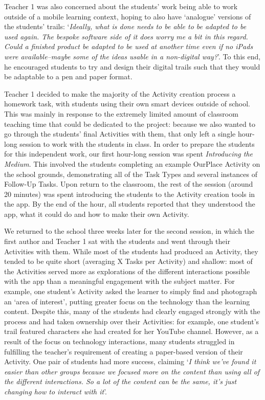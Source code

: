 \documentclass[,hyphens]{sigchi}
\begin{document}
Teacher 1 was also concerned about the students' work being able to work outside of a mobile learning context, hoping to also have `analogue' versions of the students' trails: `\textit{Ideally, what is done needs to be able to be adapted to be used again. The bespoke software side of it does worry me a bit in this regard. Could a finished product be adapted to be used at another time even if no iPads were available--maybe some of the ideas usable in a non-digital way?}'. To this end, he encouraged students to try and design their digital trails such that they would be adaptable to a pen and paper format.

Teacher 1 decided to make the majority of the Activity creation process a homework task, with students using their own smart devices outside of school. This was mainly in response to the extremely limited amount of classroom teaching time that could be dedicated to the project: because we also wanted to go through the students' final Activities with them, that only left a single hour-long session to work with the students in class. In order to prepare the students for this independent work, our first hour-long session was spent \textit{Introducing the Medium}. This involved the students completing an example OurPlace Activity on the school grounds, demonstrating all of the Task Types and several instances of Follow-Up Tasks. Upon return to the classroom, the rest of the session (around 20 minutes) was spent introducing the students to the Activity creation tools in the app. By the end of the hour, all students reported that they understood the app, what it could do and how to make their own Activity.

We returned to the school three weeks later for the second session, in which the first author and Teacher 1 sat with the students and went through their Activities with them. While most of the students had produced an Activity, they tended to be quite short (averaging X Tasks per Activity) and shallow: most of the Activities served more as explorations of the different interactions possible with the app than a meaningful engagement with the subject matter. For example, one student's Activity asked the learner to simply find and photograph an `area of interest', putting greater focus on the technology than the learning content. Despite this, many of the students had clearly engaged strongly with the process and had taken ownership over their Activities: for example, one student's trail featured characters she had created for her YouTube channel. However, as a result of the focus on technology interactions, many students struggled in fulfilling the teacher's requirement of creating a paper-based version of their Activity. One pair of students had more success, claiming `\textit{I think we've found it easier than other groups because we focused more on the content than using all of the different interactions. So a lot of the content can be the same, it's just changing how to interact with it}'.
\end{document}
